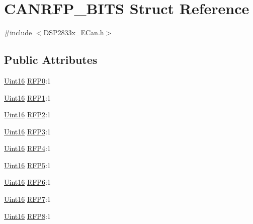 \hypertarget{struct_c_a_n_r_f_p___b_i_t_s}{}\section{C\+A\+N\+R\+F\+P\+\_\+\+B\+I\+T\+S Struct Reference}
\label{struct_c_a_n_r_f_p___b_i_t_s}


{\ttfamily \#include $<$D\+S\+P2833x\+\_\+\+E\+Can.\+h$>$}

\subsection*{Public Attributes}
\begin{DoxyCompactItemize}
\item 
\hyperlink{_d_s_p2833x___device_8h_a59a9f6be4562c327cbfb4f7e8e18f08b}{Uint16} \hyperlink{struct_c_a_n_r_f_p___b_i_t_s_ace73a245bcacb56193ffb410e2d5817b}{R\+F\+P0}\+:1
\item 
\hyperlink{_d_s_p2833x___device_8h_a59a9f6be4562c327cbfb4f7e8e18f08b}{Uint16} \hyperlink{struct_c_a_n_r_f_p___b_i_t_s_a03f0d2a8783850de51b69c76d5ad237d}{R\+F\+P1}\+:1
\item 
\hyperlink{_d_s_p2833x___device_8h_a59a9f6be4562c327cbfb4f7e8e18f08b}{Uint16} \hyperlink{struct_c_a_n_r_f_p___b_i_t_s_a39a12dfbb0ad62046f0c377503e2dcb2}{R\+F\+P2}\+:1
\item 
\hyperlink{_d_s_p2833x___device_8h_a59a9f6be4562c327cbfb4f7e8e18f08b}{Uint16} \hyperlink{struct_c_a_n_r_f_p___b_i_t_s_a585b68c08b2db4b9175088f36ca91d16}{R\+F\+P3}\+:1
\item 
\hyperlink{_d_s_p2833x___device_8h_a59a9f6be4562c327cbfb4f7e8e18f08b}{Uint16} \hyperlink{struct_c_a_n_r_f_p___b_i_t_s_a1d39f56b5b22aa26cd9744c7a33d6185}{R\+F\+P4}\+:1
\item 
\hyperlink{_d_s_p2833x___device_8h_a59a9f6be4562c327cbfb4f7e8e18f08b}{Uint16} \hyperlink{struct_c_a_n_r_f_p___b_i_t_s_a3aedd9cb3685c38e9ce067e9d7be550f}{R\+F\+P5}\+:1
\item 
\hyperlink{_d_s_p2833x___device_8h_a59a9f6be4562c327cbfb4f7e8e18f08b}{Uint16} \hyperlink{struct_c_a_n_r_f_p___b_i_t_s_a577855c1f7a01388bda782ca3b75d3b9}{R\+F\+P6}\+:1
\item 
\hyperlink{_d_s_p2833x___device_8h_a59a9f6be4562c327cbfb4f7e8e18f08b}{Uint16} \hyperlink{struct_c_a_n_r_f_p___b_i_t_s_add3143bbfbb215326b2c508feb5c59c2}{R\+F\+P7}\+:1
\item 
\hyperlink{_d_s_p2833x___device_8h_a59a9f6be4562c327cbfb4f7e8e18f08b}{Uint16} \hyperlink{struct_c_a_n_r_f_p___b_i_t_s_adce2fcd2af57d15820e10f476f261666}{R\+F\+P8}\+:1

\end{DoxyCompactItemize}
